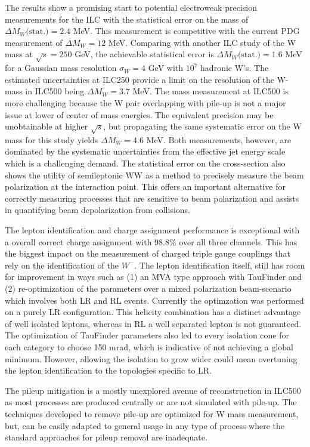 The results show a promising start to potential electroweak precision measurements for the ILC with the statistical error on the mass of $\Delta M_W\text{(stat.)}= 2.4$ MeV. This measurement is competitive with the current PDG measurement of $\Delta M_W=12$ MeV.   Comparing with another ILC study of the W mass at $\sqrt{s} = 250$ GeV, the achievable statistical error is $\Delta M_W\text{(stat.)} = 1.6$ MeV for a Gaussian mass resolution $\sigma_W= 4$ GeV with $10^7$ hadronic W's\cite{graham}. The estimated uncertainties at ILC250 provide a limit on the resolution of the W-mass in ILC500 being $\Delta M_W =3.7$ MeV. The mass measurement at ILC500 is more challenging because the W pair overlapping with pile-up is not a major issue at lower of center of mass energies. The equivalent precision may be unobtainable at higher $\sqrt{s}$, but propagating the same systematic error on the W mass for this study yields $\Delta M_W = 4.6$ MeV. Both measurements, however, are dominated by the systematic uncertainties from the effective jet energy scale which is a challenging demand.  The statistical error on the cross-section also shows the utility of semileptonic WW as a method to precisely measure the beam polarization at the interaction point. This offers an important alternative for  correctly measuring processes that are sensitive to beam polarization and assists in quantifying beam depolarization from collisions.

The lepton identification and charge assignment performance is exceptional with a overall correct charge assignment with $98.8\%$ over all three channels. This has the biggest impact on the measurement of charged triple gauge couplings that rely on the identification of the $W^-$. The lepton identification itself, still has room for improvement in ways such as (1) an MVA type approach with TauFinder and (2) re-optimization of the parameters over a mixed polarization beam-scenario which involves both LR and RL events. Currently the optimzation was performed on a purely LR configuration. This helicity combination has a distinct advantage of well isolated leptons, whereas in RL a well separated lepton is not guaranteed. The optimization of TauFinder parameters also led to every isolation cone for each category to choose 150 mrad, which is indicative of not achieving a global minimum. However, allowing the isolation to grow wider could mean overtuning the lepton identification to the topologies specific to LR. 

The pileup mitigation is a mostly unexplored avenue of reconstruction in ILC500 as most processes are produced centrally or are not simulated with pile-up. The techniques developed to remove pile-up are optimized for W mass measurement, but, can be easily adapted to general usage in any type of process where the standard approaches for pileup removal are inadequate. 

